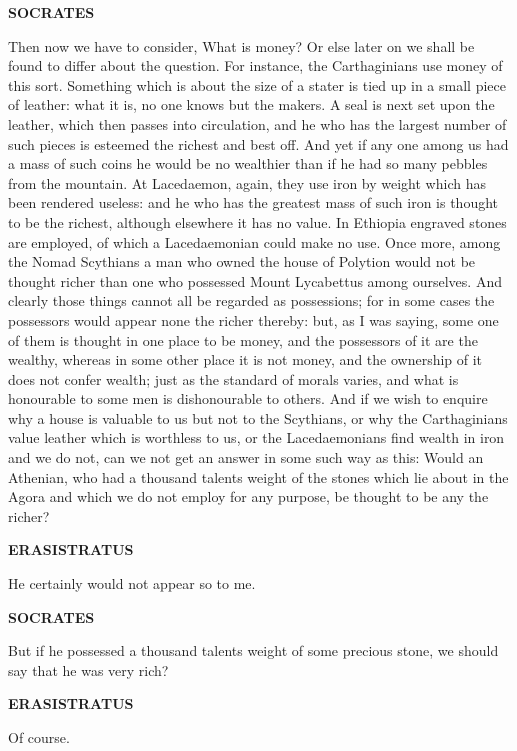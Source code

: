 \documentclass[11pt,letter]{article}
\begin{document}
\par \textbf{SOCRATES}
\par   Then now we have to consider, What is money? Or else later on we shall be found to differ about the question. For instance, the Carthaginians use money of this sort. Something which is about the size of a stater is tied up in a small piece of leather:  what it is, no one knows but the makers. A seal is next set upon the leather, which then passes into circulation, and he who has the largest number of such pieces is esteemed the richest and best off. And yet if any one among us had a mass of such coins he would be no wealthier than if he had so many pebbles from the mountain. At Lacedaemon, again, they use iron by weight which has been rendered useless:  and he who has the greatest mass of such iron is thought to be the richest, although elsewhere it has no value. In Ethiopia engraved stones are employed, of which a Lacedaemonian could make no use. Once more, among the Nomad Scythians a man who owned the house of Polytion would not be thought richer than one who possessed Mount Lycabettus among ourselves. And clearly those things cannot all be regarded as possessions; for in some cases the possessors would appear none the richer thereby:  but, as I was saying, some one of them is thought in one place to be money, and the possessors of it are the wealthy, whereas in some other place it is not money, and the ownership of it does not confer wealth; just as the standard of morals varies, and what is honourable to some men is dishonourable to others. And if we wish to enquire why a house is valuable to us but not to the Scythians, or why the Carthaginians value leather which is worthless to us, or the Lacedaemonians find wealth in iron and we do not, can we not get an answer in some such way as this:  Would an Athenian, who had a thousand talents weight of the stones which lie about in the Agora and which we do not employ for any purpose, be thought to be any the richer?

\par \textbf{ERASISTRATUS}
\par   He certainly would not appear so to me.

\par \textbf{SOCRATES}
\par   But if he possessed a thousand talents weight of some precious stone, we should say that he was very rich?

\par \textbf{ERASISTRATUS}
\par   Of course.
\end{document}
